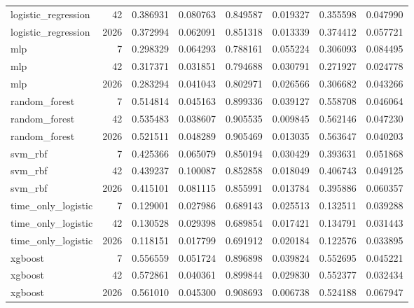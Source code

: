 \begin{tabular}{lrrrrrrr}
logistic\_regression & 42 & 0.386931 & 0.080763 & 0.849587 & 0.019327 & 0.355598 & 0.047990 \\
logistic\_regression & 2026 & 0.372994 & 0.062091 & 0.851318 & 0.013339 & 0.374412 & 0.057721 \\
mlp & 7 & 0.298329 & 0.064293 & 0.788161 & 0.055224 & 0.306093 & 0.084495 \\
mlp & 42 & 0.317371 & 0.031851 & 0.794688 & 0.030791 & 0.271927 & 0.024778 \\
mlp & 2026 & 0.283294 & 0.041043 & 0.802971 & 0.026566 & 0.306682 & 0.043266 \\
random\_forest & 7 & 0.514814 & 0.045163 & 0.899336 & 0.039127 & 0.558708 & 0.046064 \\
random\_forest & 42 & 0.535483 & 0.038607 & 0.905535 & 0.009845 & 0.562146 & 0.047230 \\
random\_forest & 2026 & 0.521511 & 0.048289 & 0.905469 & 0.013035 & 0.563647 & 0.040203 \\
svm\_rbf & 7 & 0.425366 & 0.065079 & 0.850194 & 0.030429 & 0.393631 & 0.051868 \\
svm\_rbf & 42 & 0.439237 & 0.100087 & 0.852858 & 0.018049 & 0.406743 & 0.049125 \\
svm\_rbf & 2026 & 0.415101 & 0.081115 & 0.855991 & 0.013784 & 0.395886 & 0.060357 \\
time\_only\_logistic & 7 & 0.129001 & 0.027986 & 0.689143 & 0.025513 & 0.132511 & 0.039288 \\
time\_only\_logistic & 42 & 0.130528 & 0.029398 & 0.689854 & 0.017421 & 0.134791 & 0.031443 \\
time\_only\_logistic & 2026 & 0.118151 & 0.017799 & 0.691912 & 0.020184 & 0.122576 & 0.033895 \\
xgboost & 7 & 0.556559 & 0.051724 & 0.896898 & 0.039824 & 0.552695 & 0.045221 \\
xgboost & 42 & 0.572861 & 0.040361 & 0.899844 & 0.029830 & 0.552377 & 0.032434 \\
xgboost & 2026 & 0.561010 & 0.045300 & 0.908693 & 0.006738 & 0.524188 & 0.067947 \\
\bottomrule
\end{tabular}
